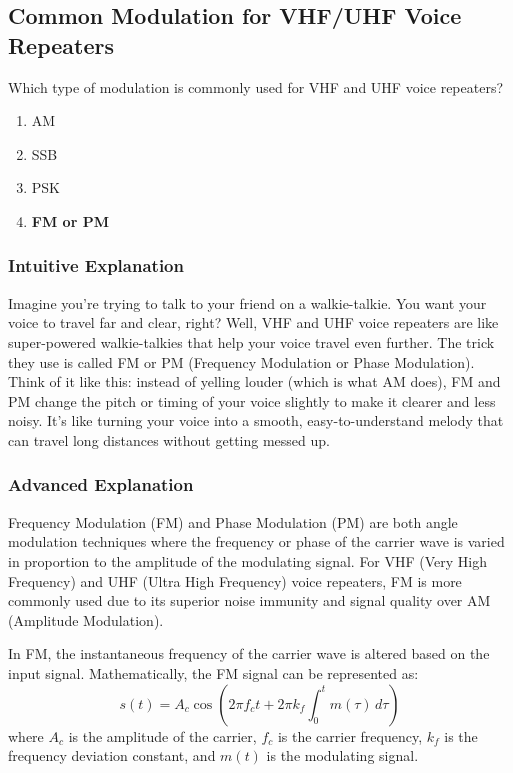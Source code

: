\subsection{Common Modulation for VHF/UHF Voice Repeaters}
\label{T8A04}

\begin{tcolorbox}[colback=gray!10!white,colframe=black!75!black,title=T8A04]
Which type of modulation is commonly used for VHF and UHF voice repeaters?
\begin{enumerate}[label=\Alph*)]
    \item AM
    \item SSB
    \item PSK
    \item \textbf{FM or PM}
\end{enumerate}
\end{tcolorbox}

\subsubsection{Intuitive Explanation}
Imagine you're trying to talk to your friend on a walkie-talkie. You want your voice to travel far and clear, right? Well, VHF and UHF voice repeaters are like super-powered walkie-talkies that help your voice travel even further. The trick they use is called FM or PM (Frequency Modulation or Phase Modulation). Think of it like this: instead of yelling louder (which is what AM does), FM and PM change the pitch or timing of your voice slightly to make it clearer and less noisy. It's like turning your voice into a smooth, easy-to-understand melody that can travel long distances without getting messed up.

\subsubsection{Advanced Explanation}
Frequency Modulation (FM) and Phase Modulation (PM) are both angle modulation techniques where the frequency or phase of the carrier wave is varied in proportion to the amplitude of the modulating signal. For VHF (Very High Frequency) and UHF (Ultra High Frequency) voice repeaters, FM is more commonly used due to its superior noise immunity and signal quality over AM (Amplitude Modulation). 

In FM, the instantaneous frequency of the carrier wave is altered based on the input signal. Mathematically, the FM signal can be represented as:
\[
s(t) = A_c \cos\left(2\pi f_c t + 2\pi k_f \int_0^t m(\tau) \, d\tau\right)
\]
where \(A_c\) is the amplitude of the carrier, \(f_c\) is the carrier frequency, \(k_f\) is the frequency deviation constant, and \(m(t)\) is the modulating signal.

